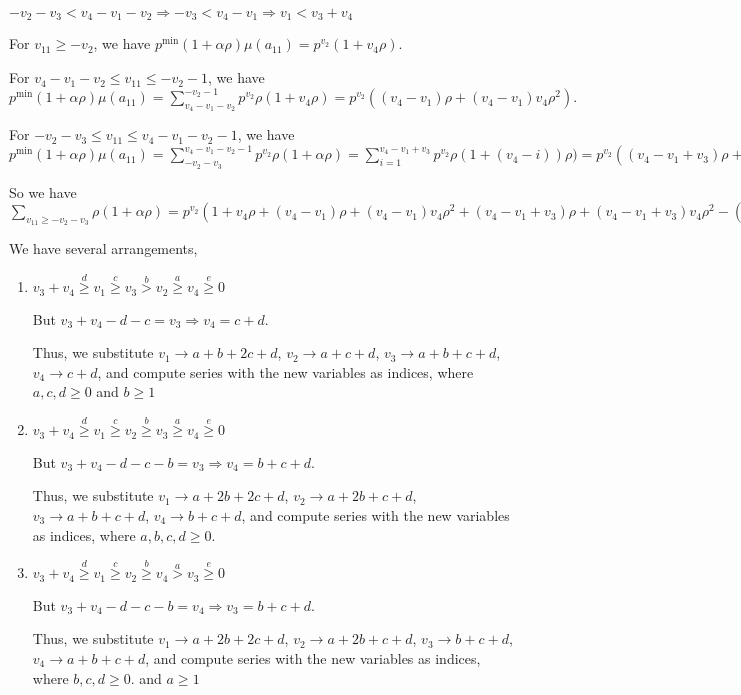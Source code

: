 \documentclass{article}
\begin{document}
$-v_2-v_3<{v_4-v_1-v_2}\Rightarrow{-v_3<{v_4-v_1}}\Rightarrow{v_1<{v_3+v_4}}$

For $v_{11}\geq{-v_2}$, we have $p^{\min}(1+\alpha\rho)\mu(a_{11})=p^{v_2}(1+v_4\rho).$

For $v_4-v_1-v_2\leq{v_{11}}\leq{-v_2-1}$, we have $p^{\min}(1+\alpha\rho)\mu(a_{11})=\sum_{v_4-v_1-v_2}^{-v_2-1}p^{v_2}\rho(1+v_4\rho)=p^{v_2}((v_4-v_1)\rho+(v_4-v_1)v_4\rho^2).$

For $-v_2-v_3\leq{v_{11}}\leq{v_4-v_1-v_2-1}$, we have $p^{\min}(1+\alpha\rho)\mu(a_{11})=\sum_{-v_2-v_3}^{v_4-v_1-v_2-1}p^{v_2}\rho(1+\alpha\rho)=\sum_{i=1}^{v_4-v_1+v_3}p^{v_2}\rho(1+(v_4-i))\rho)=p^{v_2}((v_4-v_1+v_3)\rho+(v_4-v_1+v_3)v_4\rho^2-\binom{v_4-v_1+v_3}{2}\rho^2).$

So we have $\sum_{v_{11}\geq{-v_2-v_3}}\rho(1+\alpha\rho)=p^{v_2}(
1+v_4\rho+(v_4-v_1)\rho+(v_4-v_1)v_4\rho^2+
(v_4-v_1+v_3)\rho+(v_4-v_1+v_3)v_4\rho^2-\binom{v_4-v_1+v_3}{2}\rho^2).$

We have several arrangements,
\begin{enumerate}
    \item 
$v_3+v_4\overset{d}{\geq}v_1\overset{c}{\geq}v_3\overset{b}{>}{v_2}\overset{a}{\geq}v_4\overset{e}{\geq}{0}$

But $v_3+v_4-d-c=v_3\Rightarrow{v_4=c+d}.$

Thus, we substitute $v_1\rightarrow{a+b+2c+d}$, $v_2\rightarrow{a+c+d}$, $v_3\rightarrow{a+b+c+d}$, $v_4\rightarrow{c+d}$, and compute series with the new variables as indices, where $a,c,d\geq{0}$ and $b\geq{1}$  
    \item 
$v_3+v_4\overset{d}{\geq}v_1\overset{c}{\geq}v_2\overset{b}{\geq}{v_3}\overset{a}{\geq}v_4\overset{e}{\geq}{0}$

But $v_3+v_4-d-c-b=v_3\Rightarrow{v_4=b+c+d}.$

Thus, we substitute $v_1\rightarrow{a+2b+2c+d}$, $v_2\rightarrow{a+2b+c+d}$, $v_3\rightarrow{a+b+c+d}$, $v_4\rightarrow{b+c+d}$, and compute series with the new variables as indices, where $a,b,c,d\geq{0}.$  
    \item 
$v_3+v_4\overset{d}{\geq}v_1\overset{c}{\geq}v_2\overset{b}{\geq}{v_4}\overset{a}{>}v_3\overset{e}{\geq}{0}$

But $v_3+v_4-d-c-b=v_4\Rightarrow{v_3=b+c+d}.$

Thus, we substitute $v_1\rightarrow{a+2b+2c+d}$, $v_2\rightarrow{a+2b+c+d}$, $v_3\rightarrow{b+c+d}$, $v_4\rightarrow{a+b+c+d}$, and compute series with the new variables as indices, where $b,c,d\geq{0}.$ and $a\geq{1}$  
\end{enumerate}
\end{document}

